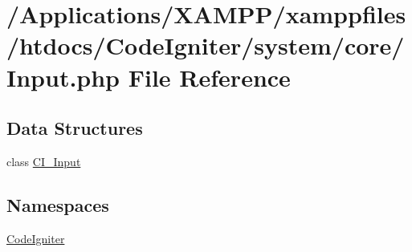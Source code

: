 \hypertarget{_input_8php}{}\section{/\+Applications/\+X\+A\+M\+P\+P/xamppfiles/htdocs/\+Code\+Igniter/system/core/\+Input.php File Reference}
\label{_input_8php}
\subsection*{Data Structures}
\begin{DoxyCompactItemize}
\item 
class \mbox{\hyperlink{class_c_i___input}{C\+I\+\_\+\+Input}}
\end{DoxyCompactItemize}
\subsection*{Namespaces}
\begin{DoxyCompactItemize}
\item 
 \mbox{\hyperlink{namespace_code_igniter}{Code\+Igniter}}
\end{DoxyCompactItemize}
